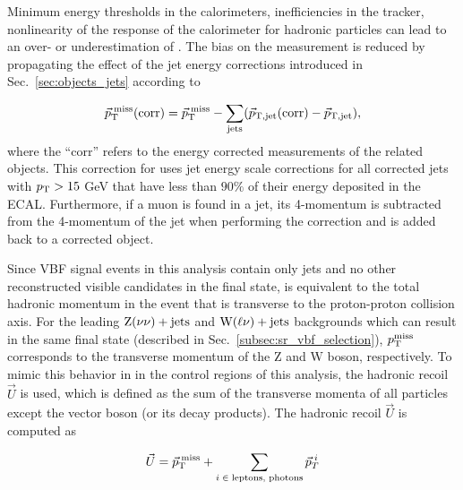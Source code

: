 Minimum energy thresholds in the calorimeters, inefficiencies
in the tracker, nonlinearity of the response of the calorimeter
for hadronic particles can lead to an over- or underestimation of \ptmiss.
The bias on the \ptmiss measurement is reduced by propagating the effect of the jet energy
corrections introduced in Sec.~\ref{sec:objects_jets} according to

\begin{equation}
\vec{p}_{\textrm{T}}^{\;\textrm{miss}}(\mathrm{corr})
=\vec{p}_{\textrm{T}}^{\;\textrm{miss}} - \sum_\mathrm{jets} (\vec{p}_\mathrm{T,jet}({\mathrm{corr}})-\vec{p}_\mathrm{T,jet}),
\label{eq:Type1MET}
\end{equation}
where the ``corr'' refers to the energy corrected measurements
of the related objects.
This correction for \ptvecmiss uses jet energy scale corrections
for all corrected jets with $p_{\textrm{T}} > 15$ GeV that have less than $90 \%$
of their energy deposited in the ECAL. Furthermore, if a muon is found in a
jet, its 4-momentum is subtracted from the 4-momentum of the jet
when performing the correction and is added back to a corrected object.

Since VBF \hinv signal events in this analysis contain only jets and no other 
reconstructed visible candidates in the final state,
\ptmiss is equivalent to the total hadronic momentum in the event that is transverse to the proton-proton collision axis. 
For the leading $\textrm{Z}(\nu\nu)+\textrm{jets}$ and $\textrm{W}(\ell\nu)+\textrm{jets}$ backgrounds which can result in the same final state 
(described in Sec.~\ref{subsec:sr_vbf_selection}), 
$p_{\textrm{T}}^{\textrm{miss}}$ corresponds to the transverse momentum of the $\textrm{Z}$ and $\textrm{W}$ boson, respectively. 
To mimic this behavior in in the control regions of this analysis, the hadronic recoil
$\vec{U}$ is used, which is defined as the sum of the transverse
momenta of all particles except the vector boson (or its decay products).
The hadronic recoil $\vec{U}$ is computed as

\begin{equation}
  \vec{U} = \vec{p}_{\textrm{T}}^{\;\textrm{miss}} + \sum _{i\;\in\;\textrm{leptons, photons}}\vec{p}_{T}^{\;i}
  \label{eq:recoil_def}
\end{equation}

